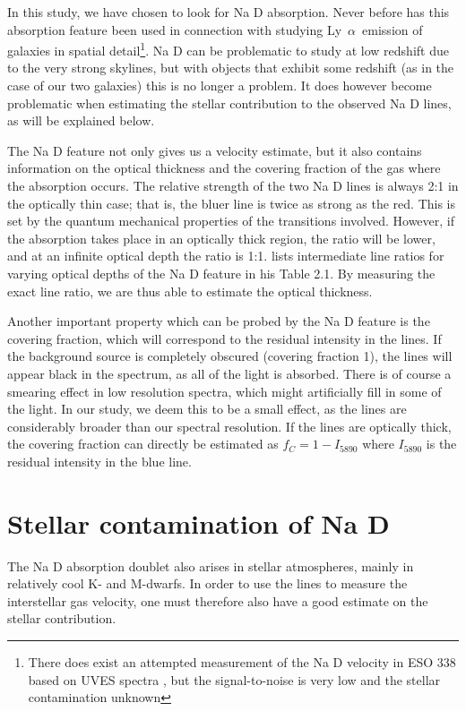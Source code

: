 \documentclass[a4wide,12pt]{book}
\newcommand{\lya}{Ly~${\alpha}$}
\begin{document}
{In this study, we have chosen to look for Na D absorption. Never before has this absorption feature been used in connection with studying \lya\ emission of galaxies in spatial detail\footnote{There does exist an attempted measurement of the Na D velocity in ESO 338 based on UVES spectra \citep{ostlin-2007}, but the signal-to-noise is very low and the stellar contamination unknown}. Na D can be problematic to study at low redshift due to the very strong skylines, but with objects that exhibit some redshift (as in the case of our two galaxies) this is no longer a problem. It does however become problematic when estimating the stellar contribution to the observed Na D lines, as will be explained below.

The Na D feature not only gives us a velocity estimate, but it also contains information on the optical thickness and the covering fraction of the gas where the absorption occurs. The relative strength of the two Na D lines is always 2:1 in the optically thin case; that is, the bluer line is twice as strong as the red. This is set by the quantum mechanical properties of the transitions involved. However, if the absorption takes place in an optically thick region, the ratio will be lower, and at an infinite optical depth the ratio is 1:1. \citet{spitzer1968} lists intermediate line ratios for varying optical depths of the Na D feature in his Table 2.1. By measuring the exact line ratio, we are thus able to estimate the optical thickness. 

Another important property which can be probed by the Na D feature is the covering fraction, which will correspond to the residual intensity in the lines. If the background source is completely obscured (covering fraction 1), the lines will appear black in the spectrum, as all of the light is absorbed. There is of course a smearing effect in low resolution spectra, which might artificially fill in some of the light.  In our study, we deem this to be a small effect, as the lines are considerably broader than our spectral resolution. If the lines are optically thick, the covering fraction can directly be estimated as $f_C = 1 - I_{5890}$ where $I_{5890}$ is the residual intensity in the blue line. 

\section{Stellar contamination of Na D}

The Na D absorption doublet also arises in stellar atmospheres, mainly in relatively cool K- and M-dwarfs. In order to use the lines to measure the interstellar gas velocity, one must therefore also have a good estimate on the stellar contribution. 

}
\end{document}
